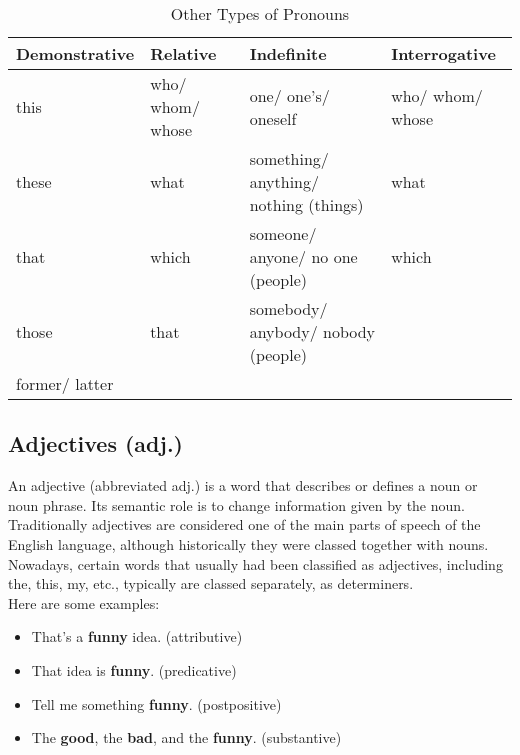 \begin{longtable}{|p{2.5cm}|p{2.5cm}|p{2.5cm}|p{2.5cm}|}
    \caption{Other Types of Pronouns}
    \\ \hline

    \textbf{Demonstrative} & \textbf{Relative} & \textbf{Indefinite} & \textbf{Interrogative}\\
    \hline
    \endfirsthead
    \hline \endhead
    \hline \endlastfoot
    \hline \endfoot

    this & who/ whom/ whose & one/ one's/ oneself & who/ whom/ whose \\ \hline
    these & what & something/ anything/ nothing (things) & what \\ \hline
    that & which & someone/ anyone/ no one (people) & which \\ \hline
    those & that & somebody/ anybody/ nobody (people) & \\ \hline
    former/ latter & & & \\ \hline

\end{longtable}



\subsection{Adjectives (adj.) \cite{wiki-adjective,wiki-eng-adjective}}

An adjective (abbreviated adj.) is a word that describes or defines a noun or noun phrase. Its semantic role is to change information given by the noun.\\

Traditionally adjectives are considered one of the main parts of speech of the English language, although historically they were classed together with nouns. Nowadays, certain words that usually had been classified as adjectives, including the, this, my, etc., typically are classed separately, as determiners. \\

Here are some examples:
\begin{itemize}
    \item That's a \textbf{funny} idea. (attributive)
    \item That idea is \textbf{funny}. (predicative)
    \item Tell me something \textbf{funny}. (postpositive)
    \item The \textbf{good}, the \textbf{bad}, and the \textbf{funny}. (substantive)
\end{itemize}


